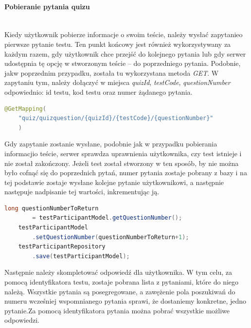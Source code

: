 \documentclass[twoside]{projektInzynierskiMS}
\numberwithin{figure}{section}
\begin{document}
\paragraph{Pobieranie pytania quizu}
\mbox{} \\ \indent
Kiedy użytkownik pobierze informacje o swoim teście, należy wysłać zapytanie\linebreak o pierwsze pytanie testu. Ten punkt końcowy jest również wykorzystywany za każdym razem, gdy użytkownik chce przejść do kolejnego pytania lub gdy serwer udostępnia tę opcję w stworzonym teście – do poprzedniego pytania. Podobnie, jak\linebreak w poprzednim przypadku, została tu wykorzystana metoda \textit{GET}. W zapytaniu tym, należy dołączyć w miejsca \textit{quizId}, \textit{testCode}, \textit{questionNumber} odpowiednio: id testu, kod testu oraz numer żądanego pytania.
\begin{lstlisting}[language=Java,caption=Deklaracja metody GET wraz z deklaracją punktu końcowego. Źródło: Opracowanie własne.,captionpos=b]
    @GetMapping(
    "quiz/quizquestion/{quizId}/{testCode}/{questionNumber}"
    )
\end{lstlisting}
Gdy zapytanie zostanie wysłane, podobnie jak w przypadku pobierania informacji\linebreak o teście, serwer sprawdza uprawnienia użytkownika, czy test istnieje i nie został zakończony. Jeżeli test został stworzony w ten sposób, by nie można było cofnąć się do poprzednich pytań, numer pytania zostaje pobrany z bazy i na tej podstawie zostaje wysłane kolejne pytanie użytkownikowi, a następnie następuje nadpisanie tej wartości, inkrementując ją.

\begin{lstlisting}[language=Java,caption=Zapisanie informacji pytaniu na którym użytkownik aktualnie się znajduje. Źródło: Opracowanie własne.,captionpos=b]
    long questionNumberToReturn 
        = testParticipantModel.getQuestionNumber();
    testParticipantModel
        .setQuestionNumber(questionNumberToReturn+1);
    testParticipantRepository
        .save(testParticipantModel);
\end{lstlisting}
Następnie należy skompletować odpowiedź dla użytkownika. W tym celu, za pomocą identyfikatora testu, zostaje pobrana lista z pytaniami, które do niego należą. Wszystkie pytania są posegregowane, a zawężenie pola poszukiwań do numeru wcześniej wspomnianego pytania sprawi, że dostaniemy konkretne, jedno pytanie.\linebreak Za pomocą identyfikatora pytania można pobrać wszystkie możliwe odpowiedzi.
\end{document}
